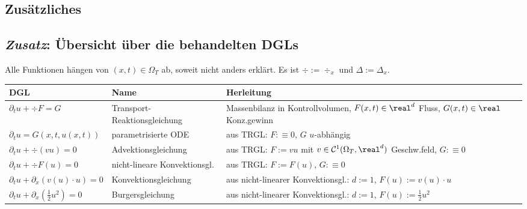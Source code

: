 \begin{landscape}
    \chapter{%
        Zusätzliches%
    }

    \section{%
        \emph{Zusatz}: Übersicht über die behandelten DGLs%
    }

    \footnotesize

    Alle Funktionen hängen von $(x, t) \in \Omega_T$ ab, soweit nicht anders erklärt.
    Es ist $\div := \div_x$ und $\Delta := \Delta_x$.

    \renewcommand*{\arraystretch}{1.2}
    \begin{tabular}{p{65mm}p{55mm}p{128mm}}
        \toprule

        \textbf{DGL} & \textbf{Name} & \textbf{Herleitung}\\

        \midrule

        $\partial_t u + \div F = G$&
        Transport-Reaktionsgleichung&
        Massenbilanz in Kontrollvolumen,
        $F(x,t) \in \real^d$ Fluss, $G(x,t) \in \real$ Konz.gewinn\\

        $\partial_t u = G(x, t, u(x,t))$&
        parametrisierte ODE&
        aus TRGL: $F :\equiv 0$, $G$ $u$-abhängig\\

        $\partial_t u + \div(vu) = 0$&
        Advektionsgleichung&
        aus TRGL: $F := vu$ mit $v \in \C^1(\Omega_T, \real^d)$ Geschw.feld, $G :\equiv 0$\\

        \midrule

        $\partial_t u + \div F(u) = 0$&
        nicht-lineare Konvektionsgl.&
        aus TRGL: $F := F(u)$, $G :\equiv 0$\\

        $\partial_t u + \partial_x (v(u) \cdot u) = 0$&
        Konvektionsgleichung&
        aus nicht-linearer Konvektionsgl.: $d := 1$, $F(u) := v(u) \cdot u$\\

        $\partial_t u + \partial_x(\frac{1}{2} u^2) = 0$&
        Burgersgleichung&
        aus nicht-linearer Konvektionsgl.: $d := 1$, $F(u) := \frac{1}{2} u^2$\\


\end{tabular}
\end{landscape}
